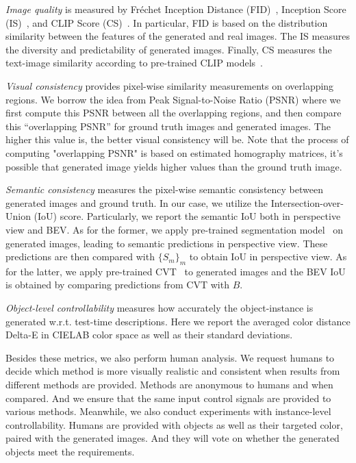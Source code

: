 \begin{packed_lefty_item}
\item \textit{Image quality} is measured by Fréchet Inception Distance (FID)~\cite{cortes2015advances}, Inception Score (IS)~\cite{salimans2016improved}, and CLIP Score (CS)~\cite{radford2021learning}. In particular, FID is based on the distribution similarity between the features of the generated and real images. The IS measures the diversity and predictability of generated images. Finally, CS measures the text-image similarity according to pre-trained CLIP models~\cite{radford2021learning}.

\item \textit{Visual consistency} provides pixel-wise similarity measurements on overlapping regions. We borrow the idea from Peak Signal-to-Noise Ratio (PSNR) where we first compute this PSNR between all the overlapping regions, and then compare this “overlapping PSNR” for ground truth images and generated images. The higher this value is, the better visual consistency will be. Note that the process of computing "overlapping PSNR" is based on estimated homography matrices, it's possible that generated image yields higher values than the ground truth image.

\item \textit{Semantic consistency} measures the pixel-wise semantic consistency between generated images and ground truth. In our case, we utilize the Intersection-over-Union (IoU) score. Particularly, we report the semantic IoU both in perspective view and BEV. As for the former, we apply pre-trained segmentation model~\cite{cheng2022masked} on generated images, leading to semantic predictions in perspective view. These predictions are then compared with $\{S_m\}_m$ to obtain IoU in perspective view. As for the latter, we apply pre-trained CVT~\cite{zhou2022cross} to generated images and the BEV IoU is obtained by comparing predictions from CVT with $\textit{B}$.

\item \textit{Object-level controllability} measures how accurately the object-instance is generated w.r.t. test-time descriptions. Here we report the averaged color distance Delta-E in CIELAB color space as well as their standard deviations.  
\end{packed_lefty_item}

Besides these metrics, we also perform human analysis. We request humans to decide which method is more visually realistic and consistent when results from different methods are provided. %
Methods are anonymous to humans and when compared. And we ensure that the same input control signals are provided to various methods. Meanwhile, we also conduct experiments with instance-level controllability. Humans are provided with objects as well as their targeted color, paired with the generated images. And they will vote on whether the generated objects meet the requirements.

